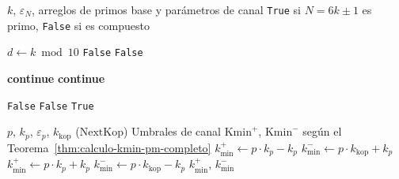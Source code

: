 \documentclass{article}
\numberwithin{equation}{section}
\theoremstyle{plain}
\theoremstyle{definition}
\begin{document}
\begin{algorithm}[htbp]
\caption{EsCandidatoPrimoKminPM($k$, $\varepsilon_N$, $\mathcal{P}_{\text{base}}$, $\mathcal{K}_p$, $\mathcal{E}_p$, $\mathcal{K}_{\min}^+$, $\mathcal{K}_{\min}^-$, tamaño)}
\label{alg:is_candidate_kminpm}
\begin{algorithmic}[1]
\Require $k$, $\varepsilon_N$, arreglos de primos base y parámetros de canal
\Ensure \texttt{True} si $N = 6k \pm 1$ es primo, \texttt{False} si es compuesto

 
    \State $d \gets k \bmod 10$
        \State \Return \texttt{False}
    \EndIf
        \State \Return \texttt{False}
    \EndIf
\EndIf

     
         \State \textbf{continue} \EndIf
    \Else {}
         \State \textbf{continue} \EndIf
    \EndIf
    
     
            \State \Return \texttt{False}
        \EndIf
    \Else {}
            \State \Return \texttt{False}
        \EndIf
    \EndIf
\EndFor
\State \Return \texttt{True}
\end{algorithmic}
\end{algorithm}

\begin{algorithm}[htbp]
\caption{CalcularKminPM($p$, $k_p$, $\varepsilon_p$, $k_{\text{kop}}$)}
\label{alg:calcular_kmin_pm}
\begin{algorithmic}[1]
\Require $p$, $k_p$, $\varepsilon_p$, $k_{\text{kop}}$ ($\mathrm{NextKop}$)
\Ensure Umbrales de canal $\mathrm{Kmin}^+$, $\mathrm{Kmin}^-$ según el Teorema~\ref{thm:calculo-kmin-pm-completo}
 
    \State $k_{\min}^+ \gets p \cdot k_p - k_p$ 
    \State $k_{\min}^- \gets p \cdot k_{\text{kop}} + k_p$ 
\Else {}
    \State $k_{\min}^+ \gets p \cdot k_p + k_p$ 
    \State $k_{\min}^- \gets p \cdot k_{\text{kop}} - k_p$ 
\EndIf
\State \Return $k_{\min}^+$, $k_{\min}^-$
\end{algorithmic}
\end{algorithm}
\end{document}
